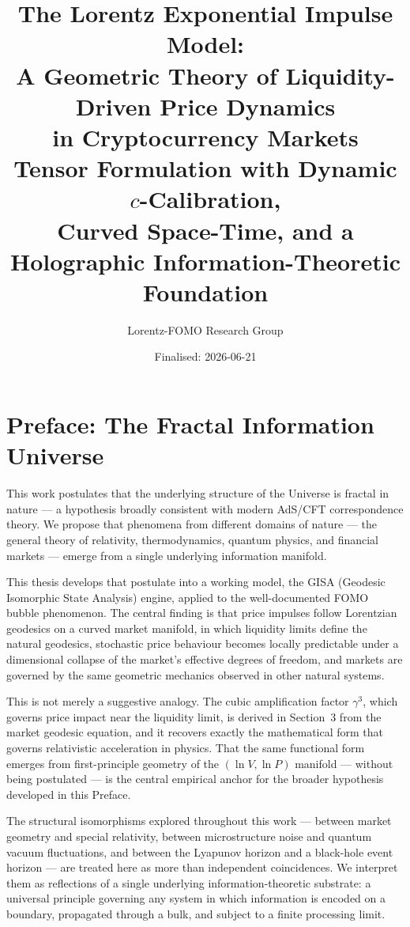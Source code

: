 \documentclass[12pt,a4paper]{article}
\title{The Lorentz Exponential Impulse Model:\\
A Geometric Theory of Liquidity-Driven Price Dynamics\\
in Cryptocurrency Markets\\[0.5em]
\large Tensor Formulation with Dynamic $c$-Calibration,\\
Curved Space-Time, and a Holographic Information-Theoretic Foundation}
\author{Lorentz-FOMO Research Group}
\date{Finalised: 2026-06-21}
\begin{document}
\maketitle


\section*{Preface: The Fractal Information Universe}

This work postulates that the underlying structure of the Universe is
fractal in nature --- a hypothesis broadly consistent with modern AdS/CFT
correspondence theory. We propose that phenomena from different domains of
nature --- the general theory of relativity, thermodynamics, quantum
physics, and financial markets --- emerge from a single underlying
information manifold.

This thesis develops that postulate into a working model, the GISA
(Geodesic Isomorphic State Analysis) engine, applied to the
well-documented FOMO bubble phenomenon. The central finding is that price
impulses follow Lorentzian geodesics on a curved market manifold, in which
liquidity limits define the natural geodesics, stochastic price behaviour
becomes locally predictable under a dimensional collapse of the market's
effective degrees of freedom, and markets are governed by the same
geometric mechanics observed in other natural systems.

This is not merely a suggestive analogy. The cubic amplification factor
$\gamma^3$, which governs price impact near the liquidity limit, is derived
in Section~3 from the market geodesic equation, and it recovers exactly
the mathematical form that governs relativistic acceleration in physics.
That the same functional form emerges from first-principle geometry of the
$(\ln V,\ln P)$ manifold --- without being postulated --- is the central
empirical anchor for the broader hypothesis developed in this Preface.

The structural isomorphisms explored throughout this work --- between
market geometry and special relativity, between microstructure noise and
quantum vacuum fluctuations, and between the Lyapunov horizon and a
black-hole event horizon --- are treated here as more than independent
coincidences. We interpret them as reflections of a single underlying
information-theoretic substrate: a universal principle governing any
system in which information is encoded on a boundary, propagated through
a bulk, and subject to a finite processing limit.
\end{document}
